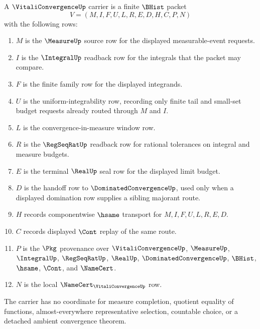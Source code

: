 \begin{definition}
\label{def:vitali-convergence-carrier}
A $\VitaliConvergenceUp$ carrier is a finite $\BHist$ packet
$$
V=(M,I,F,U,L,R,E,D,H,C,P,N)
$$
with the following rows:
\begin{enumerate}
\item $M$ is the $\MeasureUp$ source row for the displayed measurable-event requests.
\item $I$ is the $\IntegralUp$ readback row for the integrals that the packet may compare.
\item $F$ is the finite family row for the displayed integrands.
\item $U$ is the uniform-integrability row, recording only finite tail and small-set budget requests already routed through $M$ and $I$.
\item $L$ is the convergence-in-measure window row.
\item $R$ is the $\RegSeqRatUp$ readback row for rational tolerances on integral and measure budgets.
\item $E$ is the terminal $\RealUp$ seal row for the displayed limit budget.
\item $D$ is the handoff row to $\DominatedConvergenceUp$, used only when a displayed domination row supplies a sibling majorant route.
\item $H$ records componentwise $\hsame$ transport for $M,I,F,U,L,R,E,D$.
\item $C$ records displayed $\Cont$ replay of the same route.
\item $P$ is the $\Pkg$ provenance over $\VitaliConvergenceUp$, $\MeasureUp$, $\IntegralUp$, $\RegSeqRatUp$, $\RealUp$, $\DominatedConvergenceUp$, $\BHist$, $\hsame$, $\Cont$, and $\NameCert$.
\item $N$ is the local $\NameCert_{\VitaliConvergenceUp}$ row.
\end{enumerate}
The carrier has no coordinate for measure completion, quotient equality of functions, almost-everywhere representative selection, countable choice, or a detached ambient convergence theorem.
\end{definition}

